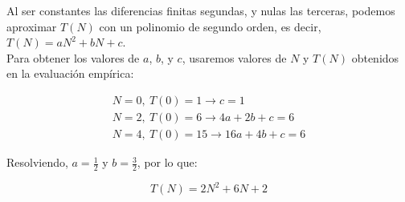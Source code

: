 Al ser constantes las diferencias finitas segundas, y nulas las terceras, podemos aproximar $T(N)$ con un polinomio de segundo orden, es decir, $T(N) = aN^2 + bN + c$.\\

Para obtener los valores de $a$, $b$, y $c$, usaremos valores de $N$ y $T(N)$ obtenidos en la evaluación empírica:

\begin{subequations}
    \begin{gather}
        N = 0,\ T(0) = 1 \rightarrow c = 1 \\
        N = 2,\ T(0) = 6 \rightarrow 4a + 2b + c = 6 \\
        N = 4,\ T(0) = 15 \rightarrow 16a + 4b + c = 6
    \end{gather}
\end{subequations}

Resolviendo, $a=\frac{1}{2}$ y $b=\frac{3}{2}$, por lo que:

\begin{equation}
    T(N) = 2N^2 + 6N + 2
\end{equation}


